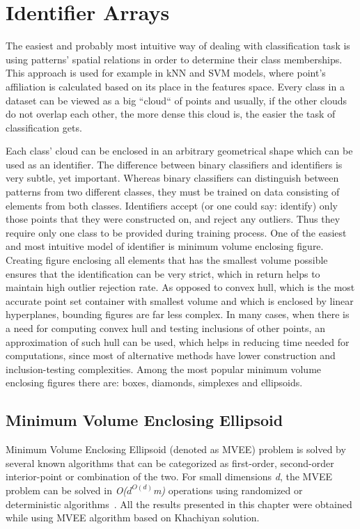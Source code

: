 \chapter{Identifier Arrays}

The easiest and probably most intuitive way of dealing with classification task is using patterns' spatial relations in order to determine their class memberships. This approach is used for example in kNN and SVM models, where point's affiliation is calculated based on its place in the features space. Every class in a dataset can be viewed as a big ``cloud`` of points and usually, if the other clouds do not overlap each other, the more dense this cloud is, the easier the task of classification gets.

Each class' cloud can be enclosed in an arbitrary geometrical shape which can be used as an identifier. The difference between binary classifiers and identifiers is very subtle, yet important. Whereas binary classifiers can distinguish between patterns from two different classes, they must be trained on data consisting of elements from both classes. Identifiers accept (or one could say: identify) only those points that they were constructed on, and reject any outliers. Thus they require only one class to be provided during training process. One of the easiest and most intuitive model of identifier is minimum volume enclosing figure. Creating figure enclosing all elements that has the smallest volume possible ensures that the identification can be very strict, which in return helps to maintain high outlier rejection rate. As opposed to convex hull, which is the most accurate point set container with smallest volume and which is enclosed by linear hyperplanes, bounding figures are far less complex. In many cases, when there is a need for computing convex hull and testing inclusions of other points, an approximation of such hull can be used, which helps in reducing time needed for computations, since most of alternative methods have lower construction and inclusion-testing complexities. Among the most popular minimum volume enclosing figures there are: boxes, diamonds, simplexes and ellipsoids.

\section{Minimum Volume Enclosing Ellipsoid}

Minimum Volume Enclosing Ellipsoid (denoted as MVEE) problem is solved by several known algorithms that can be categorized as first-order, second-order interior-point or combination of the two. For small dimensions \textit{d}, the MVEE problem can be solved in \textit{O($d^{O(d)}$m)} operations using randomized or deterministic algorithms~\cite{MVEEMichaelTodd2005}. All the results presented in this chapter were obtained while using MVEE algorithm based on Khachiyan solution.


